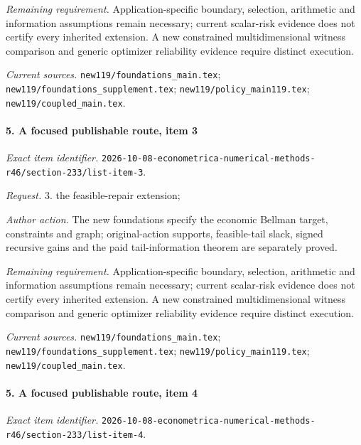 \par\emph{Remaining requirement.} Application-specific boundary, selection, arithmetic and information assumptions remain necessary; current scalar-risk evidence does not certify every inherited extension. A new constrained multidimensional witness comparison and generic optimizer reliability evidence require distinct execution.

\par\emph{Current sources.} \nolinkurl{new119/foundations_main.tex}; \nolinkurl{new119/foundations_supplement.tex}; \nolinkurl{new119/policy_main119.tex}; \nolinkurl{new119/coupled_main.tex}.

\paragraph{5. A focused publishable route, item 3}

\emph{Exact item identifier.} \nolinkurl{2026-10-08-econometrica-numerical-methods-r46/section-233/list-item-3}.

\par\emph{Request.} 3. the feasible-repair extension;

\par\emph{Author action.} The new foundations specify the economic Bellman target, constraints and graph; original-action supports, feasible-tail slack, signed recursive gains and the paid tail-information theorem are separately proved.

\par\emph{Remaining requirement.} Application-specific boundary, selection, arithmetic and information assumptions remain necessary; current scalar-risk evidence does not certify every inherited extension. A new constrained multidimensional witness comparison and generic optimizer reliability evidence require distinct execution.

\par\emph{Current sources.} \nolinkurl{new119/foundations_main.tex}; \nolinkurl{new119/foundations_supplement.tex}; \nolinkurl{new119/policy_main119.tex}; \nolinkurl{new119/coupled_main.tex}.

\paragraph{5. A focused publishable route, item 4}

\emph{Exact item identifier.} \nolinkurl{2026-10-08-econometrica-numerical-methods-r46/section-233/list-item-4}.


